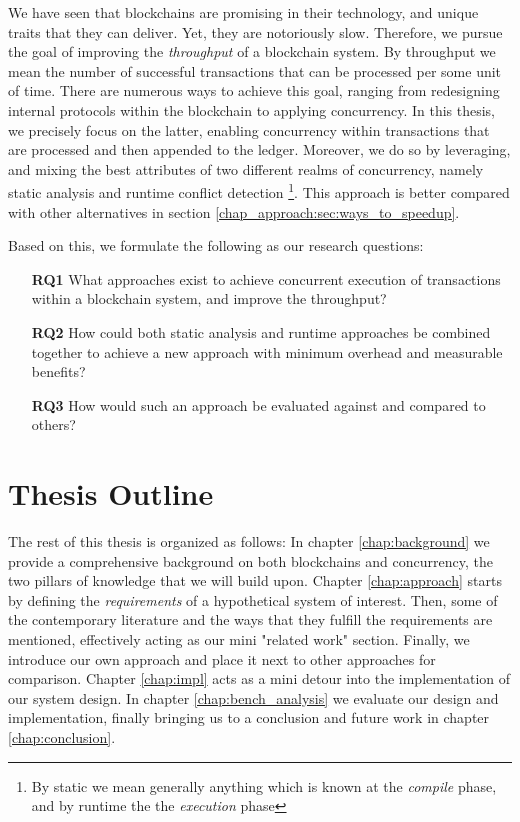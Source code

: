 We have seen that blockchains are promising in their technology, and unique traits that they can
deliver. Yet, they are notoriously slow. Therefore, we pursue the goal of improving the
\textit{throughput} of a blockchain system. By throughput we mean the number of successful
transactions that can be processed per some unit of time. There are numerous ways to
achieve this goal, ranging from redesigning internal protocols within the blockchain to applying
concurrency. In this thesis, we precisely focus on the latter, enabling concurrency within
transactions that are processed and then appended to the ledger. Moreover, we do so by leveraging,
and mixing the best attributes of two different realms of concurrency, namely static analysis and
runtime conflict detection \footnote{By static we mean generally anything which is known at the
\textit{compile} phase, and by runtime the the \textit{execution} phase}. This approach is better
compared with other alternatives in section \ref{chap_approach:sec:ways_to_speedup}.

Based on this, we formulate the following as our research questions:

 \begin{enumerate}
	\item [\textbf{RQ1}] What approaches exist to achieve concurrent execution of transactions
	within a blockchain system, and improve the throughput?

	\item [\textbf{RQ2}] How could both static analysis and runtime approaches be combined together
	to achieve a new approach with minimum overhead and measurable benefits?

	\item [\textbf{RQ3}] How would such an approach be evaluated against and compared to others?
 \end{enumerate}

\section{Thesis Outline}
The rest of this thesis is organized as follows: In chapter \ref{chap:background} we provide a
comprehensive background on both blockchains and concurrency, the two pillars of knowledge that we
will build upon. Chapter \ref{chap:approach} starts by defining the \textit{requirements} of a
hypothetical system of interest. Then, some of the contemporary literature and the ways that they
fulfill the requirements are mentioned, effectively acting as our mini "related work" section.
Finally, we introduce our own approach and place it next to other approaches for comparison. Chapter
\ref{chap:impl} acts as a mini detour into the implementation of our system design. In chapter
\ref{chap:bench_analysis} we evaluate our design and implementation, finally bringing us to a
conclusion and future work in chapter \ref{chap:conclusion}.


